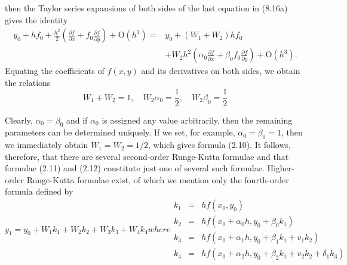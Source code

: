 \documentclass[12pt,a4paper,oneside]{book}
\begin{document}
then the Taylor series expansions of both sides of the last equation in (8.16a) gives the identity
$$
\begin{aligned}
	y_0+h f_0+\frac{h^2}{2}\left(\frac{\partial f}{\partial x}+f_0 \frac{\partial f}{\partial y}\right)+\mathrm{O}\left(h^3\right)= & y_0+\left(W_1+W_2\right) h f_0 \\
	& +W_2 h^2\left(\alpha_0 \frac{\partial f}{\partial x}+\beta_0 f_0 \frac{\partial f}{\partial y}\right)+\mathrm{O}\left(h^3\right) .
\end{aligned}
$$
Equating the coefficients of $f(x, y)$ and its derivatives on both sides, we obtain the relations
\begin{equation}
	W_1+W_2=1, \quad W_2 \alpha_0=\frac{1}{2}, \quad W_2 \beta_0=\frac{1}{2}
\end{equation}

Clearly, $\alpha_0=\beta_0$ and if $\alpha_0$ is assigned any value arbitrarily, then the remaining parameters can be determined uniquely. If we set, for example, $\alpha_0=\beta_0=1$, then we immediately obtain $W_1=W_2=1 / 2$, which gives formula (2.10).
It follows, therefore, that there are several second-order Runge-Kutta formulae and that formulae (2.11) and (2.12) constitute just one of several such formulae. 
Higher-order Runge-Kutta formulae exist, of which we mention only the fourth-order formula defined by
\begin{subequations}
	\begin{equation}
		y_1=y_0+W_1 k_1+W_2 k_2+W_3 k_3+W_4 k_4
	\end{equation}
	where
	\begin{eqnarray}
		k_1&=&h f\left(x_0, y_0\right) \\
		k_2&=&h f\left(x_0+\alpha_0 h, y_0+\beta_0 k_1\right) \\
		k_3&=&h f\left(x_0+\alpha_1 h, y_0+\beta_1 k_1+v_1 k_2\right) \\
		k_4&=&h f\left(x_0+\alpha_2 h, y_0+\beta_2 k_1+v_2 k_2+\delta_1 k_3\right)
	\end{eqnarray}
\end{subequations}
\end{document}
